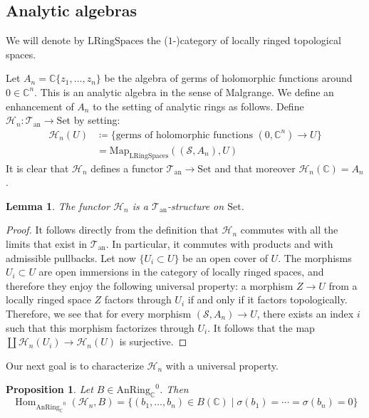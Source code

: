 \documentclass[12pt,a4paper,reqno]{amsart}
\theoremstyle{plain}
\newtheorem{lem}[thm]{Lemma}
\newtheorem{prop}[thm]{Proposition}
\theoremstyle{definition}
\theoremstyle{remark}
\numberwithin{equation}{section}
\begin{document}
\subsection{Analytic algebras}

We will denote by $\mathrm{LRingSpaces}$ the ($1$-)category of locally ringed topological spaces.

Let $A_n = \mathbb C\{z_1, \ldots, z_n\}$ be the algebra of germs of holomorphic functions around $0 \in \mathbb C^n$.
This is an analytic algebra in the sense of Malgrange.
We define an enhancement of $A_n$ to the setting of analytic rings as follows.
Define ${\mathcal H}_n \colon {{\mathcal T}_{\mathrm{an}}} \to {\mathrm{Set}}$ by setting:
\begin{align*}
{\mathcal H}_n(U) & \coloneqq \{\textrm{germs of holomorphic functions } (0, \mathbb C^n) \to U\} \\
& = \mathrm{Map}_{\mathrm{LRingSpaces}}(({\mathcal S}, A_n), U)
\end{align*}
It is clear that ${\mathcal H}_n$ defines a functor ${{\mathcal T}_{\mathrm{an}}} \to {\mathrm{Set}}$ and that moreover ${\mathcal H}_n(\mathbb C) = A_n$.

\begin{lem}
	The functor ${\mathcal H}_n$ is a ${{\mathcal T}_{\mathrm{an}}}$-structure on ${\mathrm{Set}}$.
\end{lem}

\begin{proof}
	It follows directly from the definition that ${\mathcal H}_n$ commutes with all the limits that exist in ${{\mathcal T}_{\mathrm{an}}}$.
	In particular, it commutes with products and with admissible pullbacks.
	Let now $\{U_i \subset U\}$ be an open cover of $U$.
	The morphisms $U_i \subset U$ are open immersions in the category of locally ringed spaces, and therefore they enjoy the following universal property: a morphism $Z \to U$ from a locally ringed space $Z$ factors through $U_i$ if and only if it factors topologically.
	Therefore, we see that for every morphism $({\mathcal S}, A_n) \to U$, there exists an index $i$ such that this morphism factorizes through $U_i$.
	It follows that the map $\coprod {\mathcal H}_n(U_i) \to {\mathcal H}_n(U)$ is surjective.
\end{proof}

Our next goal is to characterize ${\mathcal H}_n$ with a universal property.

\begin{prop} \label{prop:UMP_of_H_n}
	Let $B \in {\mathrm{AnRing}_{\mathbb C}}^0$. Then
	\[ \operatorname{Hom}_{{\mathrm{AnRing}_{\mathbb C}}^0}({\mathcal H}_n, B) = \{(b_1, \ldots, b_n) \in B(\mathbb C) \mid \sigma(b_1) = \cdots = \sigma(b_n) = 0 \} \]
\end{prop}
\end{document}
